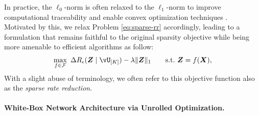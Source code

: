 \documentclass[../../book-main.tex]{subfiles}
\begin{document}

In practice, the $\ell_0$-norm is often relaxed to the $\ell_1$-norm to improve computational traceability and enable convex optimization techniques \cite{Wright-Ma-2022}. Motivated by this, we relax Problem \eqref{eq:sparse-rr} accordingly, leading to a formulation that remains faithful to the original sparsity objective while being more amenable to efficient algorithms as follow:  
\begin{equation}
\begin{aligned}
   \max_{f \in \mathcal{F}}\    \Delta R_{\epsilon}(\Z \mid \vU_{[K]}) - \lambda \|\bm{Z}\|_1  \qquad \text{s.t.}\ \Z = f(\X),
   \label{eq:sparse-rr-1}
\end{aligned}
\end{equation}
 With a slight abuse of terminology, we often refer to this objective function also as the \textit{sparse rate reduction}. 

\paragraph{White-Box Network Architecture via Unrolled Optimization.} 

\end{document}
